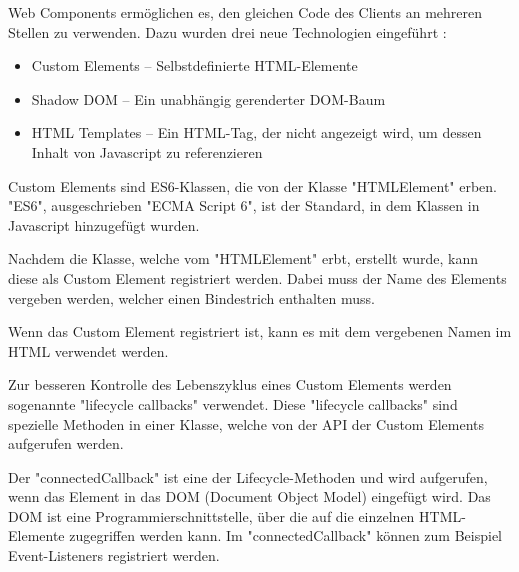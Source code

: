 
Web Components ermöglichen es, den gleichen Code des Clients an mehreren Stellen zu verwenden. 
Dazu wurden drei neue Technologien eingeführt \cite{MDNWebComponents}:

\begin{itemize}
    \item Custom Elements -- Selbstdefinierte HTML-Elemente
    \item Shadow DOM -- Ein unabhängig gerenderter DOM-Baum
    \item HTML Templates -- Ein HTML-Tag, der nicht angezeigt wird, um dessen Inhalt von Javascript zu referenzieren
\end{itemize}



Custom Elements sind ES6-Klassen, die von der Klasse "{\ttfamily HTMLElement}" erben. 
"ES6", ausgeschrieben "ECMA Script 6", ist der Standard, in dem Klassen in Javascript hinzugefügt wurden. \cite{MDNes6Classes}


Nachdem die Klasse, welche vom "{\ttfamily HTMLElement}" erbt, erstellt wurde, kann diese als Custom Element registriert werden. 
Dabei muss der Name des Elements vergeben werden, welcher einen Bindestrich enthalten muss.


Wenn das Custom Element registriert ist, kann es mit dem vergebenen Namen im HTML verwendet werden.


Zur besseren Kontrolle des Lebenszyklus eines Custom Elements werden sogenannte "lifecycle callbacks" verwendet.
Diese "lifecycle callbacks" sind spezielle Methoden in einer Klasse, welche von der API der Custom Elements aufgerufen werden. \cite{MDNWebCustomElements}


Der "{\ttfamily connectedCallback}" ist eine der Lifecycle-Methoden und wird aufgerufen, wenn das Element in das DOM (Document Object Model) eingefügt wird. 
Das DOM ist eine Programmierschnittstelle, über die auf die einzelnen HTML-Elemente zugegriffen werden kann. \cite{MDNDOM} Im "{\ttfamily connectedCallback}" können zum Beispiel Event-Listeners registriert werden. \cite{MDNWebCustomElements}

